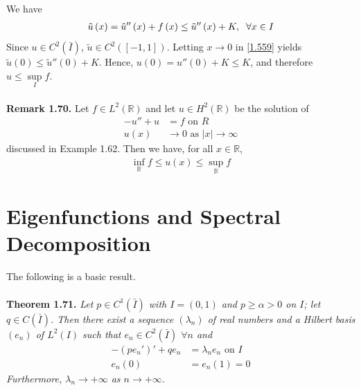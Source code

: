 \documentclass[a4paper,oneside]{book}
\numberwithin{equation}{chapter}
\begin{document}
We have
\begin{align}
\label{1.559}
\tilde u\left( x \right) = \tilde u''\left( x \right) + f\left( x \right) \le \tilde u''\left( x \right) + K,\hspace{0.2cm}\forall x \in I
\end{align}
Since $u\in C^2\left(\bar I\right)$, $\tilde u\in C^2\left(\left[-1,1\right]\right)$. Letting $x\to 0$ in \eqref{1.559} yields $\tilde u\left( 0 \right) \le \tilde u''\left( 0 \right) + K$. Hence, $u\left(0\right)=u''\left(0\right)+K \le K$, and therefore $u \le \mathop {\sup }\limits_I f$.\\
\\
\textbf{Remark 1.70.} Let $f\in L^2\left(\mathbb{R}\right)$ and let $u\in H^2\left(\mathbb{R}\right)$ be the solution of 
\begin{align}
 - u'' + u &= f\mbox{ on } R\\
u\left( x \right) &\to 0\mbox{ as } \left| x \right| \to \infty 
\end{align}
discussed in Example 1.62. Then we have, for all $x\in \mathbb{R}$,
\begin{align}
\mathop {\inf }\limits_{\mathbb{R}} f \le u\left( x \right) \le \mathop {\sup }\limits_{\mathbb{R}} f
\end{align}
\section{Eigenfunctions and Spectral Decomposition}
The following is a basic result.\\
\\
\textbf{Theorem 1.71.} \textit{Let $p\in C^1\left(\bar I\right)$ with $I=\left(0,1\right)$ and $p\ge \alpha >0$ on $I$; let $q\in C\left(\bar I\right)$. Then there exist a sequence $\left(\lambda _n\right)$ of real numbers and a Hilbert basis $\left(e_n\right)$ of $L^2\left(I\right)$ such that $e_n\in C^2\left(\bar I\right)$ $\forall n$ and}
\begin{align}
\label{1.563}
 - \left( {p{e_n}'} \right)' + q{e_n} &= {\lambda _n}{e_n}\mbox{ on } I\\
{e_n}\left( 0 \right) &= {e_n}\left( 1 \right) = 0 \label{1.564}
\end{align}
\textit{Furthermore, $\lambda _n\to +\infty$ as $n\to +\infty$.}\\
\end{document}
